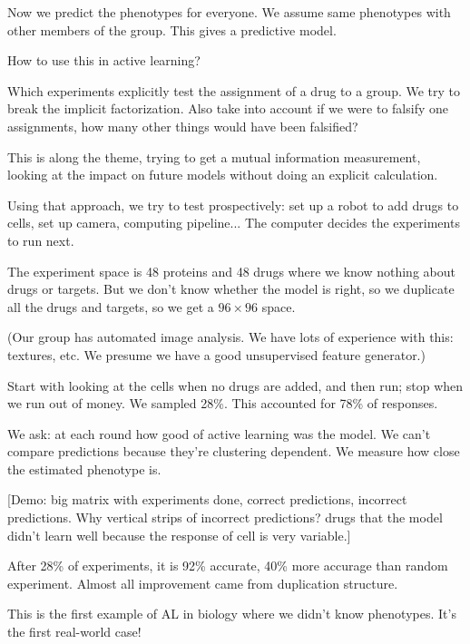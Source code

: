Now we predict the phenotypes for everyone. We assume same phenotypes with other members of the group. This gives a predictive model.

How to use this in active learning?

Which experiments explicitly test the assignment of a drug to a group. We try to break the implicit factorization. Also take into account if we were to falsify one assignments, how many other things would have been falsified?

This is along the theme, trying to get a mutual information measurement, looking at the impact on future models without doing an explicit calculation.

Using that approach, we try to test prospectively: set up a robot to add drugs to cells, set up camera, computing pipeline... %
The computer decides the experiments to run next. %


The experiment space is 48 proteins and 48 drugs where we know nothing about drugs or targets. But we don't know whether the model is right, so we duplicate all the drugs and targets, so we get a $96\times 96$ space.

(Our group has automated image analysis. We have lots of experience with this: textures, etc. We presume we have a good unsupervised feature generator.)

Start with looking at the cells when no drugs are added, and then run; stop when we run out of money.
We sampled 28\%. This accounted for 78\% of responses. 

We ask: at each round how good of active learning was the model. We can't compare predictions because they're clustering dependent. We measure how close the estimated phenotype is.

[Demo: big matrix with experiments done, correct predictions, incorrect predictions. Why vertical strips of incorrect predictions? drugs that the model didn't learn well because the response of cell is very variable.]

After 28\% of experiments, it is 92\% accurate, 40\% more accurage than random experiment. Almost all improvement came from duplication structure.

This is the first example of AL in biology where we didn't know phenotypes. It's the first real-world case!

